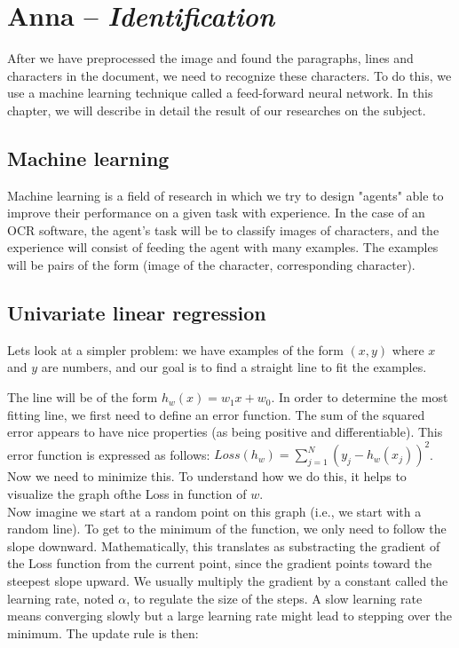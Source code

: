 \chapter{Anna -- \emph{Identification}}

After we have preprocessed the image and found the paragraphs, lines and characters in the document, we need to recognize these characters. To do this, we use a machine learning technique called a feed-forward neural network. In this chapter, we will describe in detail the result of our researches on the subject.

\section{Machine learning}

Machine learning is a field of research in which we try to design "agents" able
to improve their performance on a given task with experience. In the case of an
OCR software, the agent's task will be to classify images of characters, and the
experience will consist of feeding the agent with many examples. The examples
will be pairs of the form (image of the character, corresponding character).

\section{Univariate linear regression}

Lets look at a simpler problem: we have examples of the form $(x, y)$ where $x$
and $y$ are numbers, and our goal is to find a straight line to fit the
examples.\\

\begin{center}
\end{center}

The line will be of the form $h_w(x) = w_1x + w_0$. In order to determine the
most fitting line, we first need to define an error function. The sum of the
squared error appears to have nice properties (as being positive and
differentiable). This error function is expressed as follows:
$Loss(h_w) = \sum\limits_{j=1}^{N}(y_j - h_w(x_j))^{2}$. Now we need to minimize
this. To understand how we do this, it helps to visualize the graph ofthe Loss
in function of $w$.\\

Now imagine we start at a random point on this graph (i.e., we start with a
random line). To get to the minimum of the function, we only need to follow the
slope downward. Mathematically, this translates as substracting the gradient of
the Loss function from the current point, since the gradient points toward the
steepest slope upward. We usually multiply the gradient by a constant called the
learning rate, noted $\alpha$, to regulate the size of the steps. A slow
learning rate means converging slowly but a large learning rate might lead to
stepping over the minimum. The update rule is then:\\

